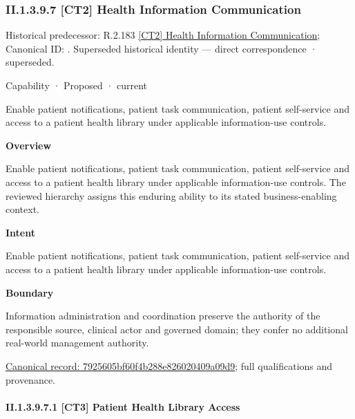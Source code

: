 \subsubsection*{II.1.3.9.7 [CT2] Health Information Communication}
\label{navigation:II.1.3.9.7}

{\small Historical predecessor: R.2.183 \hyperref[element:bcefb378424842fcb6d703208c3f8773]{[CT2] Health Information Communication}; Canonical ID: \texttt{}. Superseded historical identity — direct correspondence · superseded.}\par
\label{element:7925605bf60f4b288e826020409a09d9}
{\small Capability · Proposed · current}\par

Enable patient notifications, patient task communication, patient self-service and access to a patient health library under applicable information-use controls.



\textbf{Overview}



Enable patient notifications, patient task communication, patient self-service and access to a patient health library under applicable information-use controls. The reviewed hierarchy assigns this enduring ability to its stated business-enabling context.



\textbf{Intent}



Enable patient notifications, patient task communication, patient self-service and access to a patient health library under applicable information-use controls.



\textbf{Boundary}



Information administration and coordination preserve the authority of the responsible source, clinical actor and governed domain; they confer no additional real-world management authority.


{\footnotesize \href{../../../../../../../continuum/strategy/capability/7925605bf60f4b288e826020409a09d9.md}{Canonical record: 7925605bf60f4b288e826020409a09d9}; full qualifications and provenance.}\par
\paragraph*{II.1.3.9.7.1 [CT3] Patient Health Library Access}
\label{navigation:II.1.3.9.7.1}

